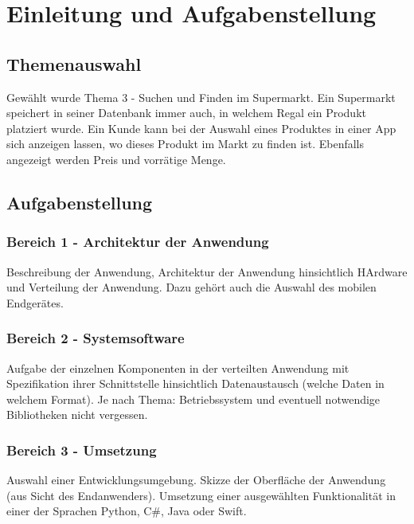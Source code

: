 \section{Einleitung und Aufgabenstellung}

\subsection{Themenauswahl}
Gewählt wurde Thema 3 - Suchen und Finden im Supermarkt.
Ein Supermarkt speichert in seiner Datenbank immer auch, in welchem Regal ein Produkt platziert wurde.
Ein Kunde kann bei der Auswahl eines Produktes in einer App sich anzeigen lassen, wo dieses Produkt im Markt zu finden ist.
Ebenfalls angezeigt werden Preis und vorrätige Menge.

\subsection{Aufgabenstellung}
\subsubsection{Bereich 1 - Architektur der Anwendung}
Beschreibung der Anwendung, Architektur der Anwendung hinsichtlich HArdware und Verteilung der Anwendung.
Dazu gehört auch die Auswahl des mobilen Endgerätes.

\subsubsection{Bereich 2 - Systemsoftware}
Aufgabe der einzelnen Komponenten in der verteilten Anwendung mit Spezifikation ihrer Schnittstelle hinsichtlich Datenaustausch (welche Daten in welchem Format).
Je nach Thema: Betriebssystem und eventuell notwendige Bibliotheken nicht vergessen.

\subsubsection{Bereich 3 - Umsetzung}
Auswahl einer Entwicklungsumgebung.
Skizze der Oberfläche der Anwendung (aus Sicht des Endanwenders).
Umsetzung einer ausgewählten Funktionalität in einer der Sprachen Python, C\#, Java oder Swift.